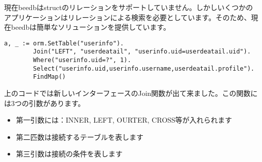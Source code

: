 現在beedbはstructのリレーションをサポートしていません。しかしいくつかのアプリケーションはリレーションによる検索を必要としています。そのため、現在beedbは簡単なソリューションを提供しています。

\begin{lstlisting}[numbers=none]
a, _ := orm.SetTable("userinfo").
        Join("LEFT", "userdeatail", "userinfo.uid=userdeatail.uid").
        Where("userinfo.uid=?", 1).
        Select("userinfo.uid,userinfo.username,userdeatail.profile").
        FindMap()
\end{lstlisting}


上のコードでは新しいインターフェースのJoin関数が出て来ました。この関数には3つの引数があります。

\begin{itemize}
  \item 第一引数には：INNER, LEFT, OURTER, CROSS等が入れられます
  \item 第二匹数は接続するテーブルを表します
  \item 第三引数は接続の条件を表します
\end{itemize}
